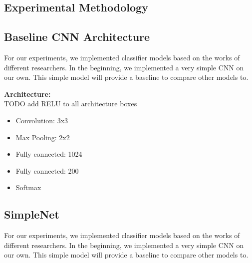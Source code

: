 \documentclass[10pt]{article} %
\begin{document}
\subsection{Experimental Methodology}

\subsection{Baseline CNN Architecture}

For our experiments, we implemented classifier models based on the works of different researchers. In the beginning, we implemented a very simple CNN on our own. This simple model will provide a baseline to compare other models to.

\begin{tcolorbox}
\textbf{Architecture:}
\\ TODO add RELU to all architecture boxes
	\begin{itemize}
		\setlength\itemsep{-0.3em}
		\item Convolution: 3x3
		\item Max Pooling: 2x2
		\item Fully connected: 1024
		\item Fully connected: 200
		\item Softmax
	\end{itemize}
\end{tcolorbox}

\subsection{SimpleNet}

For our experiments, we implemented classifier models based on the works of different researchers. In the beginning, we implemented a very simple CNN on our own. This simple model will provide a baseline to compare other models to.
\end{document}
